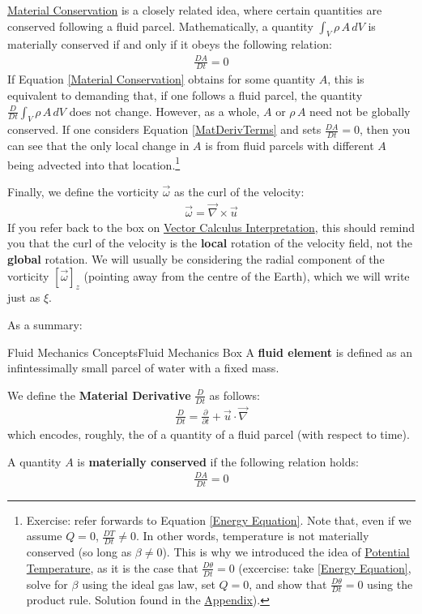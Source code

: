 \hyperref[Material Conservation]{Material Conservation} is a closely related idea, where certain quantities are conserved following a fluid parcel. Mathematically, a quantity \(\int_V \rho\,A\,dV\) is materially conserved if and only if it obeys the following relation:
\begin{align}\label{Material Conservation}
    \frac{D A}{Dt }=0
\end{align}
If Equation \ref{Material Conservation} obtains for some quantity \(A\), this is equivalent to demanding that, if one follows a fluid parcel, the quantity \(\frac{D}{Dt}\int_V \rho\,A \, dV\) does not change. However, as a whole, \(A\) or \(\rho\,A\) need not be globally conserved. If one considers Equation \ref{MatDerivTerms} and sets \(\frac{D A}{Dt }=0\), then you can see that the only local change in \(A\) is from fluid parcels with different \(A\) being advected into that location.\footnote{Exercise: refer forwards to Equation \ref{Energy Equation}. Note that, even if we assume \(Q=0\), \(\frac{DT}{Dt}\neq 0\). In other words, temperature is not materially conserved (so long as \(\beta\neq0\)). This is why we introduced the idea of \hyperref[eq Potential Temperature]{Potential Temperature}, as it is the case that \(\frac{D\theta}{Dt}=0\) (excercise: take \ref{Energy Equation}, solve for \(\beta\) using the ideal gas law, set \(Q=0\), and show that \(\frac{D\theta}{Dt}=0\) using the product rule. Solution found in the \hyperref[Appendix]{Appendix}).}

Finally, we define the vorticity \(\vec{\omega}\) as the curl of the velocity:
\begin{align}
    \label{eq Vorticity}
    \vec{\omega}=\vec{\nabla}\times\vec{u}
\end{align}
If you refer back to the box on \hyperref[VC Interp]{Vector Calculus Interpretation}, this should remind you that the curl of the velocity is the \textbf{local} rotation of the velocity field, not the \textbf{global} rotation. We will usually be considering the radial component of the vorticity \([\vec{\omega}]_z\) (pointing away from the centre of the Earth), which we will write just as \(\xi\).

As a summary:
\begin{fact}{Fluid Mechanics Concepts}{Fluid Mechanics Box}\label{Fluid Mechanics Box}
    A \textbf{fluid element} is defined as an infintessimally small parcel of water with a fixed mass.

    We define the \textbf{Material Derivative} \(\frac{D}{Dt}\) as follows:
    \begin{align*}
        \frac{D}{Dt}=\frac{\partial}{\partial t}+\vec{u}\cdot\vec{\nabla}
    \end{align*}
    which encodes, roughly, the of a quantity of a fluid parcel (with respect to time).

    A quantity \(A\) is \textbf{materially conserved} if the following relation holds:
    \begin{align*}
        \frac{DA}{Dt}=0
    \end{align*}
\end{fact}

